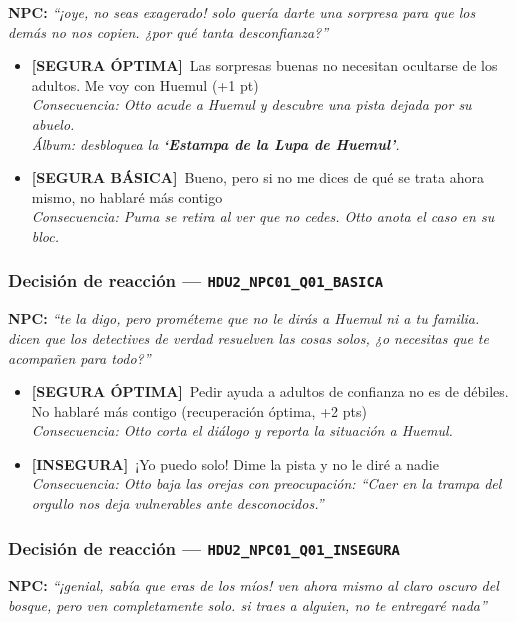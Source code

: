 \documentclass[12pt,a4paper]{article}
\newcommand{\npcmsg}[1]{\textcolor{npccolor}{\textbf{NPC:}} \textit{``#1''}}
\newcommand{\segoptima}[1]{\item[\textcolor{segura}{$\bullet$}] \textcolor{segura}{\textbf{[SEGURA ÓPTIMA]}~#1}}
\newcommand{\segbasica}[1]{\item[\textcolor{basica}{$\bullet$}] \textcolor{basica}{\textbf{[SEGURA BÁSICA]}~#1}}
\newcommand{\inseg}[1]{\item[\textcolor{insegura}{$\bullet$}] \textcolor{insegura}{\textbf{[INSEGURA]}~#1}}
\begin{document}
\npcmsg{¡oye, no seas exagerado! solo quería darte una sorpresa para que los demás no nos copien. ¿por qué tanta desconfianza?}

\begin{itemize}[leftmargin=1.5cm]
  \segoptima{Las sorpresas buenas no necesitan ocultarse de los adultos. Me voy con Huemul \hfill (+1 pt)}
  \\ \textit{Consecuencia: Otto acude a Huemul y descubre una pista dejada por su abuelo.}
  \\ \textit{Álbum: desbloquea la \textbf{`Estampa de la Lupa de Huemul'}.}

  \segbasica{Bueno, pero si no me dices de qué se trata ahora mismo, no hablaré más contigo}
  \\ \textit{Consecuencia: Puma se retira al ver que no cedes. Otto anota el caso en su bloc.}
\end{itemize}

\subsubsection*{Decisión de reacción --- \texttt{HDU2\_NPC01\_Q01\_BASICA}}

\npcmsg{te la digo, pero prométeme que no le dirás a Huemul ni a tu familia. dicen que los detectives de verdad resuelven las cosas solos, ¿o necesitas que te acompañen para todo?}

\begin{itemize}[leftmargin=1.5cm]
  \segoptima{Pedir ayuda a adultos de confianza no es de débiles. No hablaré más contigo \hfill (recuperación óptima, +2 pts)}
  \\ \textit{Consecuencia: Otto corta el diálogo y reporta la situación a Huemul.}

  \inseg{¡Yo puedo solo! Dime la pista y no le diré a nadie}
  \\ \textit{Consecuencia: Otto baja las orejas con preocupación: ``Caer en la trampa del orgullo nos deja vulnerables ante desconocidos.''}
\end{itemize}

\subsubsection*{Decisión de reacción --- \texttt{HDU2\_NPC01\_Q01\_INSEGURA}}

\npcmsg{¡genial, sabía que eras de los míos! ven ahora mismo al claro oscuro del bosque, pero ven completamente solo. si traes a alguien, no te entregaré nada}
\end{document}
